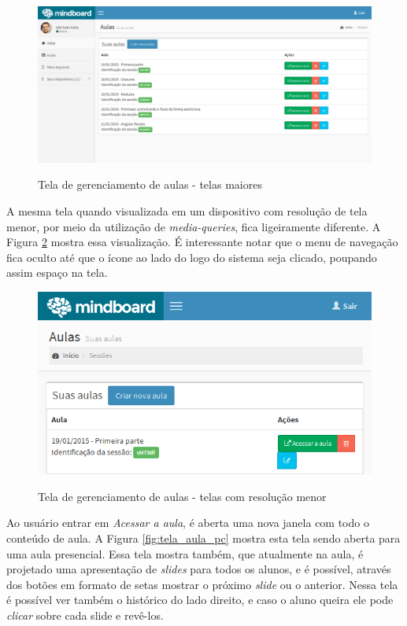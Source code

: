 \begin{figure}
\centering
\caption{Tela de gerenciamento de aulas - telas maiores}
\includegraphics[width=1.0\textwidth]{imgs/tela_aulas.png} 
\label{fig:tela_aulas} 
\end{figure}

A mesma tela quando visualizada em um dispositivo com resolução de tela menor, por meio da utilização de \emph{media-queries}, fica ligeiramente diferente. A Figura \ref{fig:tela_aulas_mob} mostra essa visualização. É interessante notar que o menu de navegação fica oculto até que o ícone ao lado do logo do sistema seja clicado, poupando assim espaço na tela.

\begin{figure}
\centering
\caption{Tela de gerenciamento de aulas - telas com resolução menor}
\includegraphics[width=1.0\textwidth]{imgs/tela_aulas_mob_paisagem.png} 
\label{fig:tela_aulas_mob} 
\end{figure}

Ao usuário entrar em \emph{Acessar a aula}, é aberta uma nova janela com todo o conteúdo de aula. A Figura \ref{fig:tela_aula_pc} mostra esta tela sendo aberta para uma aula presencial. Essa tela mostra também, que atualmente na aula, é projetado uma apresentação de \emph{slides} para todos os alunos, e é possível, através dos botões em formato de setas mostrar o próximo \emph{slide} ou o anterior. Nessa tela é possível ver também o histórico do lado direito, e caso o aluno queira ele pode \emph{clicar} sobre cada slide e revê-los.

